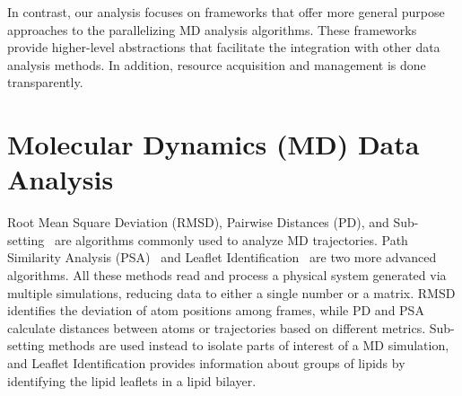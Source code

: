In contrast, our analysis focuses on frameworks that offer more general 
purpose approaches to the parallelizing MD analysis algorithms.
These frameworks provide higher-level abstractions that facilitate the
integration with other data analysis methods. In addition, resource acquisition
and management is done transparently.

\section{Molecular Dynamics (MD) Data Analysis}
\label{sec:md_use_cases}

Root Mean Square Deviation (RMSD), Pairwise Distances (PD), and
Sub-setting~\cite{mura2014biomolecules} are algorithms commonly used to analyze
MD trajectories. Path Similarity Analysis (PSA)~\cite{seyler2015path} and
Leaflet Identification~\cite{michaud2011mdanalysis} are two more advanced
algorithms. All these methods read and process a physical system generated via
multiple simulations, reducing data to either a single number or a matrix. RMSD
identifies the deviation of atom positions among frames, while PD and PSA
calculate distances between atoms or trajectories based on different metrics.
Sub-setting methods are used instead to isolate parts of interest of a MD
simulation, and Leaflet Identification provides information about groups of
lipids by identifying the lipid leaflets in a lipid bilayer.

